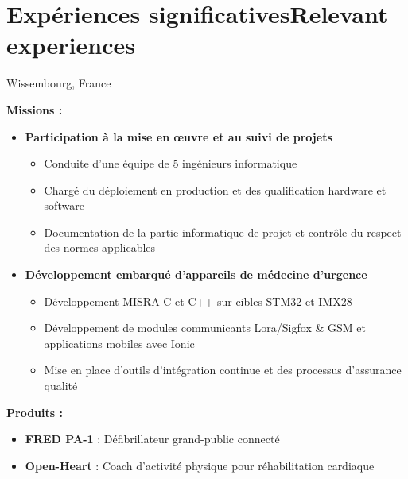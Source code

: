 \section{\ifnativelang Exp\'eriences significatives\else Relevant experiences\fi}

{}{}{Wissembourg, France}{
\ifnativelang
	\textcolor{color1}{\textbf{Missions :}}
	\begin{itemize}
		\item \textbf{Participation \`a la mise en \oe uvre et au suivi de projets}
		\begin{itemize}
			\item Conduite d’une équipe de 5 ingénieurs informatique
			\item Chargé du déploiement en production et des qualification hardware et software
			\item Documentation de la partie informatique de projet et contrôle du respect des normes applicables
		\end{itemize}
		\item \textbf{Développement embarqué d'appareils de médecine d’urgence}
		\begin{itemize}
			\item D\'eveloppement MISRA C et C++ sur cibles STM32 et IMX28
			\item D\'eveloppement de modules communicants Lora/Sigfox \& GSM et applications mobiles avec Ionic
			\item Mise en place d'outils d'intégration continue et des processus d'assurance qualit\'e
		\end{itemize}
	\end{itemize}
	\textcolor{color1}{\textbf{Produits :}}
	\begin{itemize}
		\item \textbf{FRED PA-1} : Défibrillateur grand-public connecté \textcolor{color1}{\href{http://www.schiller.ch/fr/fr/product/fred-pa-1}{\ExternalLink}}
		\item \textbf{Open-Heart} : Coach d'activit\'e physique pour r\'ehabilitation cardiaque \textcolor{color1}{\href{http://www.schiller.ch/fr/fr/schiller-\%C3\%A0-la-fine-pointe-de-la-sant\%C3\%A9-connect\%C3\%A9e}{\ExternalLink}}

\end{itemize}}
